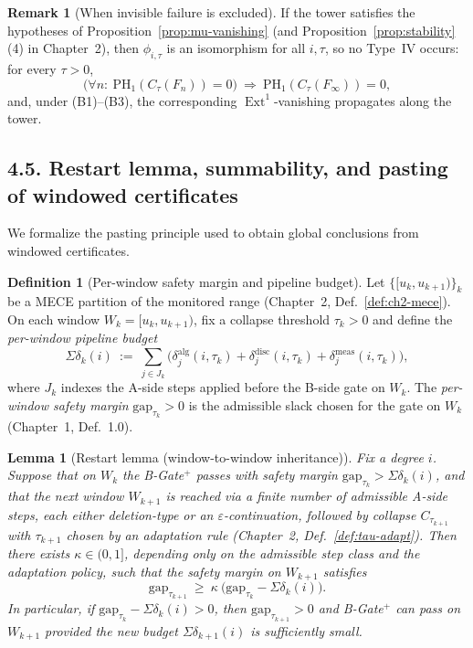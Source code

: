 \documentclass[11pt]{article}
\DeclareMathOperator{\Ext}{Ext}
\numberwithin{equation}{section}
\newtheorem{lemma}[theorem]{Lemma}
\theoremstyle{definition}
\newtheorem{definition}[theorem]{Definition}
\newtheorem{remark}[theorem]{Remark}
\begin{document}
\begin{remark}[When invisible failure is excluded]
If the tower satisfies the hypotheses of Proposition~\ref{prop:mu-vanishing} (and Proposition~\ref{prop:stability}\,(4) in Chapter~2), then $\phi_{i,\tau}$ is an isomorphism for all $i,\tau$, so no Type~IV occurs: for every $\tau>0$,
\[
\bigl(\forall n:\ \mathrm{PH}_1(C_\tau(F_n))=0\bigr)\ \Longrightarrow\ \mathrm{PH}_1(C_\tau(F_\infty))=0,
\]
and, under \textup{(B1)–(B3)}, the corresponding $\Ext^1$-vanishing propagates along the tower.
\end{remark}

\subsection*{4.5. Restart lemma, summability, and pasting of windowed certificates}
We formalize the pasting principle used to obtain global conclusions from windowed certificates.

\begin{definition}[Per-window safety margin and pipeline budget]\label{def:window-budget}
Let $\{[u_k,u_{k+1})\}_k$ be a MECE partition of the monitored range (Chapter~2, Def.~\ref{def:ch2-mece}). On each window $W_k=[u_k,u_{k+1})$, fix a collapse threshold $\tau_k>0$ and define the \emph{per-window pipeline budget}
\[
\Sigma\delta_k(i)\ :=\ \sum_{j\in J_k} \bigl(\delta^{\mathrm{alg}}_{j}(i,\tau_k)+\delta^{\mathrm{disc}}_{j}(i,\tau_k)+\delta^{\mathrm{meas}}_{j}(i,\tau_k)\bigr),
\]
where $J_k$ indexes the A-side steps applied before the B-side gate on $W_k$. The \emph{per-window safety margin} $\mathrm{gap}_{\tau_k}>0$ is the admissible slack chosen for the gate on $W_k$ (Chapter~1, Def.~1.0).
\end{definition}

\begin{lemma}[Restart lemma (window-to-window inheritance)]\label{lem:restart}
Fix a degree $i$. Suppose that on $W_k$ the B-Gate$^{+}$ passes with safety margin $\mathrm{gap}_{\tau_k}>\Sigma\delta_k(i)$, and that the next window $W_{k+1}$ is reached via a finite number of admissible A-side steps, each either deletion-type or an $\varepsilon$-continuation, followed by collapse $C_{\tau_{k+1}}$ with $\tau_{k+1}$ chosen by an adaptation rule (Chapter~2, Def.~\ref{def:tau-adapt}). Then there exists $\kappa\in (0,1]$, depending only on the admissible step class and the adaptation policy, such that the safety margin on $W_{k+1}$ satisfies
\[
\mathrm{gap}_{\tau_{k+1}}\ \ge\ \kappa\ \bigl(\mathrm{gap}_{\tau_k}-\Sigma\delta_k(i)\bigr).
\]
In particular, if $\mathrm{gap}_{\tau_k}-\Sigma\delta_k(i)>0$, then $\mathrm{gap}_{\tau_{k+1}}>0$ and B-Gate$^{+}$ can pass on $W_{k+1}$ provided the new budget $\Sigma\delta_{k+1}(i)$ is sufficiently small.
\end{lemma}
\end{document}
